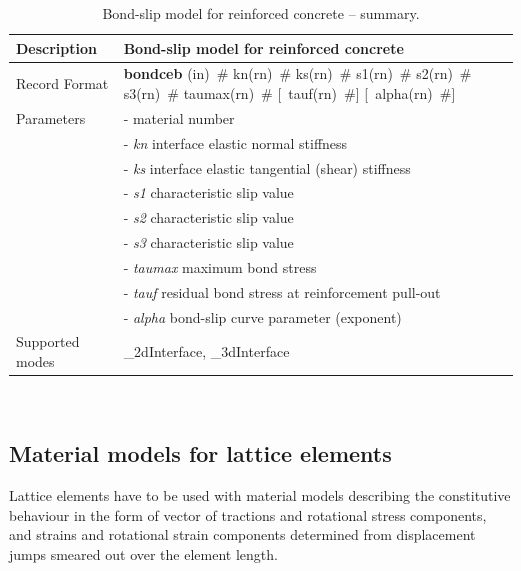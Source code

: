 \documentclass[a4paper]{article}
\newcommand{\descitem}[1]{{\noindent \bf #1}}
\newcommand{\elemparam}[2]{{{#1\tiny (#2)}~\#}}
\newcommand{\optelemparam}[2]{[{~\elemparam{#1}{#2}}]}
\newcommand{\param}[1]{{\it #1}}
\newenvironment{mmt}{\begin{tabular}{|l|p{9cm}|}}{\end{tabular}\\}
\newenvironment{mmt}{\begin{tabular}{|l|l|}}{\end{tabular}\\}
\begin{document}
\begin{table}[!htb]
\begin{mmt}
\hline
Description & Bond-slip model for reinforced concrete\\
\hline
Record Format & \descitem{bondceb}  \elemparam{}{in}
\elemparam{kn}{rn}  \elemparam{ks}{rn} \elemparam{s1}{rn} \elemparam{s2}{rn} \elemparam{s3}{rn} \elemparam{taumax}{rn} \optelemparam{tauf}{rn}  \optelemparam{alpha}{rn}\\
Parameters &- \param{} material number\\
&- \param{kn} interface elastic normal stiffness\\
&- \param{ks} interface elastic tangential (shear) stiffness\\
&- \param{s1} characteristic slip value\\
&- \param{s2} characteristic slip value\\
&- \param{s3} characteristic slip value\\
&- \param{taumax} maximum bond stress\\
&- \param{tauf} residual bond stress at reinforcement pull-out\\
&- \param{alpha} bond-slip curve parameter (exponent)\\

Supported modes& \_2dInterface, \_3dInterface\\
\hline
\end{mmt}
\caption{Bond-slip model for reinforced concrete -- summary.}
\label{bondceb_table}
\end{table}


\subsection{Material models for lattice elements}

Lattice elements have to be used with material models describing the constitutive behaviour in the form of vector of tractions and rotational stress components, and strains and rotational strain components determined from displacement jumps smeared out over the element length. 
\end{document}

